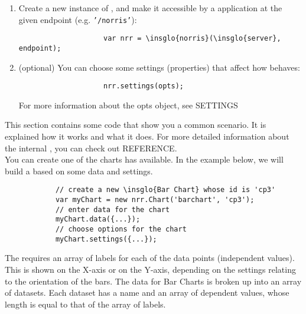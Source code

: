 \begin{itemize}
\begin{enumerate}
\begin{lstlisting}
				\end{lstlisting}
				\item Create a new instance of , and make it accessible by a  application at the given endpoint (e.g. \texttt{'/norris'}):
				\begin{lstlisting}
					var nrr = \insglo{norris}(\insglo{server}, endpoint);
				\end{lstlisting}
				\item (optional) You can choose some settings (properties) that affect how  behaves:
				\begin{lstlisting}
					nrr.settings(opts);
				\end{lstlisting}
				For more information about the opts object, see  SETTINGS
			\end{enumerate}
		\end{itemize}
		This section contains some code that show you a common scenario. It is explained how it works and what it does. For more detailed information about the internal , you can check out  REFERENCE.\\
		You can create one of the charts  has available. In the example below, we will build a  based on some data and settings.
		\begin{lstlisting}
			// create a new \insglo{Bar Chart} whose id is 'cp3'
			var myChart = new nrr.Chart('barchart', 'cp3');
			// enter data for the chart
			myChart.data({...});
			// choose options for the chart
			myChart.settings({...});
		\end{lstlisting}
			The  requires an array of labels for each of the data points (independent values). This is shown on the X-axis or on the Y-axis, depending on the settings relating to the orientation of the bars. The data for Bar Charts is broken up into an array of datasets. Each dataset has a name and an array of dependent values, whose length is equal to that of the array of labels.